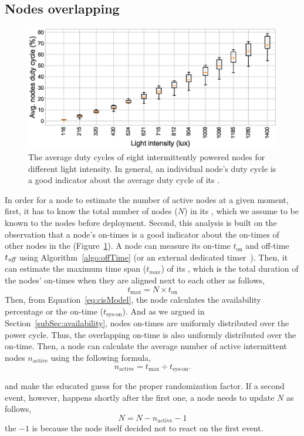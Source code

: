 \subsection{Nodes overlapping}
\begin{figure}[t]
		\centering
		\includegraphics[width=\columnwidth]{figures/cis_dutyCycle.eps}
		\caption{The average duty cycles of eight intermittently powered nodes for different light intensity. In general, an individual node's duty cycle is a good indicator about the average duty cycle of its \sys.}
		\label{fig:cis_nodes_dutyCycle}
\end{figure} 
In order for a node to estimate the number of active nodes at a given moment, first, it has to know the total number of nodes ($N$) in its \sys, which we assume to be known to the nodes before deployment. Second, this analysis is built on the observation that a node's on-times is a good indicator about the on-times of other nodes in the \sys (Figure~\ref{fig:cis_nodes_dutyCycle}). A node can measure its on-time $t_\text{on}$ and off-time $t_\text{\it off}$ using  Algorithm~\ref{algo:offTime} (or an external dedicated timer~\cite{hester2017timely}). Then, it can estimate the maximum time span ($t_{max}$) of its \sys, which is the total duration of the nodes' on-times when they are aligned next to each other as follows,
$$
t_\text{max} = N\times t_\text{on}
$$
Then, from Equation~\ref{eq:cisModel}, the node calculates the \sys availability percentage or the \sys on-time ($t_\text{sys-on}$). And as we argued in Section~\ref{subSec:availability}, nodes on-times are uniformly distributed over the \sys power cycle. Thus, the overlapping on-time is also uniformly distributed over the \sys on-time. Then, a node can calculate the average number of active intermittent nodes $n_\text{active}$ using the following formula,
$$
n_\text{active} = t_\text{max} \div t_\text{sys-on}.
$$

and make the educated guess for the proper randomization factor. If a second event, however, happens shortly after the first one, a node needs to update $N$ as follows, 
$$
N = N - n_\text{active}-1
$$
the $-1$ is because the node itself decided not to react on the first event. 